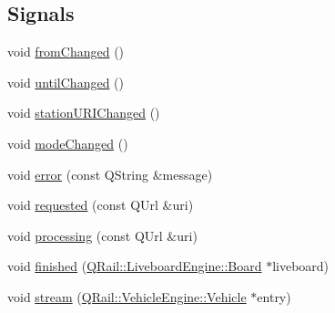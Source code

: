 \subsection*{Signals}
\begin{DoxyCompactItemize}
\item 
void \mbox{\hyperlink{classQRail_1_1LiveboardEngine_1_1Factory_a32f0025c70c2c793d66208f558a7a355}{from\+Changed}} ()
\item 
void \mbox{\hyperlink{classQRail_1_1LiveboardEngine_1_1Factory_a81b9ba54949f8389e63a65c4e91e3d19}{until\+Changed}} ()
\item 
void \mbox{\hyperlink{classQRail_1_1LiveboardEngine_1_1Factory_ac879b9931b3168dceb8e3ad111aa774c}{station\+U\+R\+I\+Changed}} ()
\item 
void \mbox{\hyperlink{classQRail_1_1LiveboardEngine_1_1Factory_a77c3c40bf35560a3893a3f162156f41a}{mode\+Changed}} ()
\item 
void \mbox{\hyperlink{classQRail_1_1LiveboardEngine_1_1Factory_a0c8fab5c22d9a46f00afea2fd9224421}{error}} (const Q\+String \&message)
\item 
void \mbox{\hyperlink{classQRail_1_1LiveboardEngine_1_1Factory_a81b2d8c3bde4886199fba81e09fd8cdd}{requested}} (const Q\+Url \&uri)
\item 
void \mbox{\hyperlink{classQRail_1_1LiveboardEngine_1_1Factory_ab71b4c2d7d4f99fd4b12b0e92c0d8965}{processing}} (const Q\+Url \&uri)
\item 
void \mbox{\hyperlink{classQRail_1_1LiveboardEngine_1_1Factory_a3a429744d6ed2685d62fe554dd2e84cb}{finished}} (\mbox{\hyperlink{classQRail_1_1LiveboardEngine_1_1Board}{Q\+Rail\+::\+Liveboard\+Engine\+::\+Board}} $\ast$liveboard)
\item 
void \mbox{\hyperlink{classQRail_1_1LiveboardEngine_1_1Factory_a554a8d4a9cdd0e0306763a003036ef93}{stream}} (\mbox{\hyperlink{classQRail_1_1VehicleEngine_1_1Vehicle}{Q\+Rail\+::\+Vehicle\+Engine\+::\+Vehicle}} $\ast$entry)
\end{DoxyCompactItemize}
